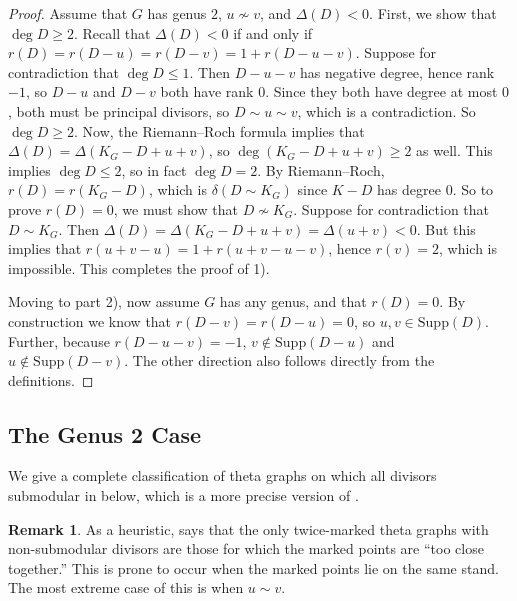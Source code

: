 \documentclass[11pt]{article}
\theoremstyle{definition}
\newtheorem{rema}[theo]{Remark}
\numberwithin{equation}{section}
\newcommand{\Supp}{\mathrm{Supp}}
\begin{document}
\begin{proof}
Assume that $G$ has genus $2$, $u \not\sim v$, and $\Delta(D) < 0$.
First, we show that $\deg D \geq 2$.
Recall that $\Delta(D) <0$ if and only if $r(D) = r(D-u) = r(D-v) = 1+r(D-u-v)$. Suppose for contradiction that $\deg D \leq 1$. Then $D-u-v$ has negative degree, hence rank $-1$, so $D-u$ and $D-v$ both have rank $0$. Since they both have degree at most $0$, both must be principal divisors, so $D \sim u \sim v$, which is a contradiction. So $\deg D \geq 2$. Now, the Riemann--Roch formula implies that $\Delta(D) = \Delta(K_G-D+u+v)$, so $\deg (K_G-D+u+v) \geq 2$ as well. This implies $\deg D \leq 2$, so in fact $\deg D = 2$. By Riemann--Roch, $r(D) = r(K_G-D)$, which is $\delta(D \sim K_G)$ since $K-D$ has degree $0$. So to prove $r(D) = 0$, we must show that $D \not\sim K_G$. Suppose for contradiction that $D \sim K_G$. Then $\Delta(D) = \Delta(K_G-D+u+v) = \Delta(u+v) < 0$. But this implies that $r(u+v-u) = 1 + r(u+v-u-v)$, hence $r(v) = 2$, which is impossible. This completes the proof of 1).  

Moving to part 2), now assume $G$ has any genus, and that $r(D) = 0$. By construction we know that $r(D-v) = r(D-u) = 0$, so $u,v \in \Supp(D)$. Further, because $r(D-u-v) = -1$, $v \not \in \Supp(D-u)$ and $u \not \in \Supp(D-v)$. The other direction also follows directly from the definitions.
\end{proof}


\subsection{The Genus 2 Case}

We give a complete classification of theta graphs on which all divisors submodular in  below, which is a more precise version of .

\begin{rema}\label{rem-closePoints}
    As a heuristic,  says that the only twice-marked theta graphs with non-submodular divisors are those for which the marked points are ``too close together.'' This is prone to occur when the marked points lie on the same stand. The most extreme case of this is when  $u\sim v$.
\end{rema}
\end{document}
